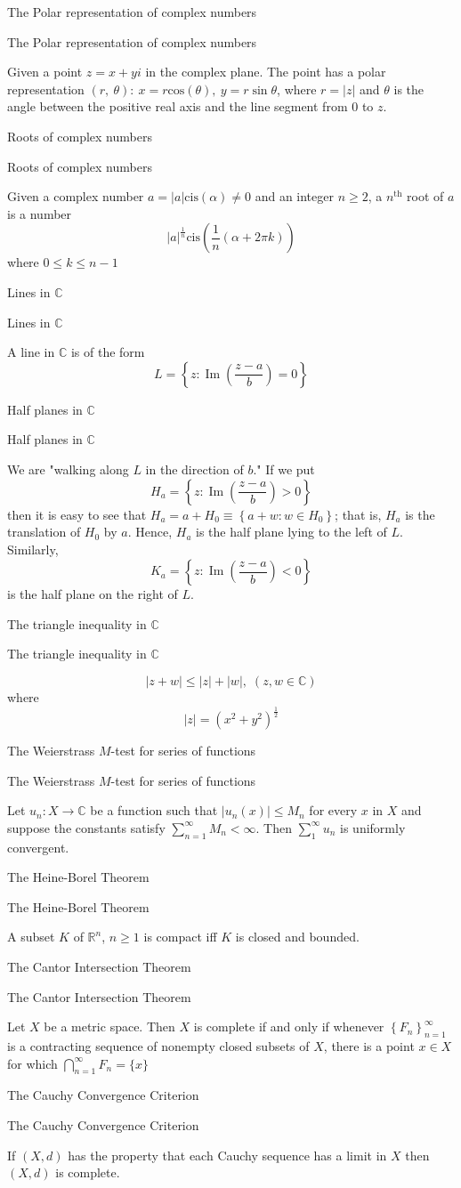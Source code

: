 \documentclass[17pt]{extarticle}
\newcommand{\R}{\mathbb{R}}
\newcommand{\C}{\mathbb{C}}
\renewcommand{\cos}[1]{\text{cos}\left(#1\right)}
\newcommand{\boxset}[2]{\begin{mdframed}[style=darkQuesion]
  #1
    \end{mdframed}
    \newpage
    \begin{mdframed}[style=darkQuesion]
      #1
        \end{mdframed}
    \begin{mdframed}[style=darkAnswer]
      #2
        \end{mdframed}
        \newpage
  }
\begin{document}
\par
\newpage
\boxset{The Polar representation of complex numbers}
{Given a point $z=x+yi$ in the complex plane. The point has a polar
representation $\left( r,\ \theta\right):\ x=r\cos{\theta},\ y=r\sin{\theta}$, where $r=\left|z\right|$
and $\theta$ is the angle between the positive real axis and the line
segment from $0$ to $z$.}
\boxset{Roots of complex numbers}
{Given a complex number $a=\left|a\right|\text{cis}\left(\alpha\right)\neq 0$ and an integer
$n\geq 2$, a $n^{\text{th}}$
root of $a$ is a number
\[\left|a\right|^{\frac{1}{n}}\text{cis}\left( \frac{1}{n}\left( \alpha+2\pi k\right)\right)\]
where $0\leq k \leq n-1$
}
\boxset{Lines in $\C$}
{A line in $\C$ is of the form
\[L=\left\{z: \operatorname{Im}\left(\frac{z-a}{b}\right)=0\right\}\]
}
\boxset{Half planes in $\C$}
{We are "walking along $L$ in the direction of $b$." If we put
\[H_{a}=\left\{z: \operatorname{Im}\left(\frac{z-a}{b}\right)>0\right\}\]
then it is easy to see that $H_{a}=a+H_{0} \equiv\left\{a+w: w \in H_{0}\right\}$; that is, $H_{a}$ is the translation of $H_{0}$ by $a$. Hence, $H_{a}$ is the half plane lying to the left of $L$. Similarly,
\[K_{a}=\left\{z: \operatorname{Im}\left(\frac{z-a}{b}\right)<0\right\}\]
is the half plane on the right of $L$.}
\boxset{The triangle inequality in $\C$}
{\[|z+w| \leq|z|+|w|,\;(z, w \in \C)\]
where
\[|z|=\left(x^{2}+y^{2}\right)^{\frac{1}{2}}\]
}
\boxset{The Weierstrass $M$-test for series of functions}
{
 Let $u_{n}: X \rightarrow \C$ be a function such that $\left|u_{n}(x)\right| \leq M_{n}$ for every $x$ in $X$ and suppose the constants satisfy $\sum_{n=1}^{\infty} M_{n}<\infty$. Then $\sum_{1}^{\infty} u_{n}$ is uniformly convergent.
}
\boxset{The Heine-Borel Theorem}
{A subset $K$ of $\R^n$, $n\geq 1$ is compact iff $K$ is closed and bounded.}
\boxset{The Cantor Intersection Theorem}
{Let $X$ be a metric space. Then $X$ is complete if and only if whenever $\left\{F_{n}\right\}_{n=1}^{\infty}$ is a contracting sequence of nonempty closed subsets of $X$, there is a point $x \in X$ for which $\bigcap_{n=1}^{\infty} F_{n}=\{x\}$}
\boxset{The Cauchy Convergence Criterion}
{If $(X, d)$ has the property that each Cauchy sequence has a limit in $X$ then $(X, d)$ is complete.}
\end{document}
